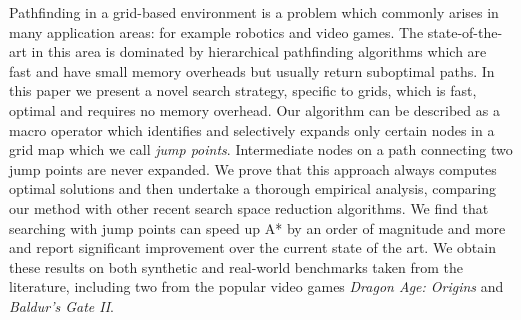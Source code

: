 Pathfinding in a grid-based environment is a problem which commonly arises in
many application areas: for example robotics and video games.  The
state-of-the-art in this area is dominated by hierarchical pathfinding
algorithms which are fast and have small memory overheads but usually return
suboptimal paths.  
In this paper we present a novel search strategy, specific to grids, which is
fast, optimal and requires no memory overhead. Our algorithm can be described as
a macro operator which identifies and selectively expands only certain
nodes in a grid map which we call \emph{jump points}.  Intermediate nodes on a
path connecting two jump points are never expanded.  We prove  
that this approach always computes optimal solutions and then undertake
a thorough empirical analysis, comparing our method with other recent search
space reduction algorithms.  We find that searching with jump points can speed
up A* by an order of magnitude and more and report significant improvement over
the current state of the art.  We obtain these results on both synthetic and
real-world benchmarks taken from the literature, including two from the popular
video games \emph{Dragon Age: Origins} and \emph{Baldur's Gate II}.
